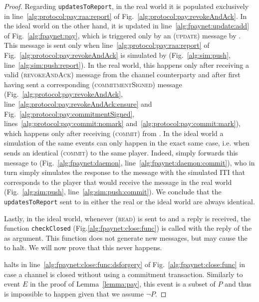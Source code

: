 \begin{proof}
  Regarding \texttt{updatesToReport}, in the real world it is populated
  exclusively in line~\ref{alg:protocol:pay:raa:report} of
  Fig.~\ref{alg:protocol:pay:revokeAndAck}. In the ideal world on the other
  hand, it is updated in line~\ref{alg:fpaynet:update:add} of
  Fig.~\ref{alg:fpaynet:pay}, which is triggered only by an (\textsc{update})
  message by \simulator. This message is sent only when
  line~\ref{alg:protocol:pay:raa:report} of
  Fig.~\ref{alg:protocol:pay:revokeAndAck} is simulated by \simulator{}
  (Fig.~\ref{alg:sim:push}, line~\ref{alg:sim:push:report}). In the real world,
  this happens only after receiving a valid (\textsc{revokeAndAck}) message from
  the channel counterparty and after first having sent a corresponding
  (\textsc{commitmentSigned}) message (Fig.~\ref{alg:protocol:pay:revokeAndAck},
  line~\ref{alg:protocol:pay:revokeAndAck:ensure} and
  Fig.~\ref{alg:protocol:pay:commitmentSigned},
  lines~\ref{alg:protocol:pay:commit:nomark}
  and~\ref{alg:protocol:pay:commit:mark}), which happens only after receiving
  (\textsc{commit}) from \environment. In the ideal world a simulation of the
  same events can only happen in the exact same case, i.e. when \environment{}
  sends an identical (\textsc{commit}) to the same player. Indeed, \fpaynet{}
  simply forwards this message to \simulator{} (Fig.~\ref{alg:fpaynet:daemon},
  line~\ref{alg:fpaynet:daemon:commit}), who in turn simply simulates the
  response to the message with the simulated ITI that corresponds to the player
  that would receive the message in the real world (Fig.~\ref{alg:sim:push},
  line~\ref{alg:sim:push:commit}). We conclude that the \texttt{updatesToReport}
  sent to \environment{} in either the real or the ideal world are always
  identical.

  Lastly, in the ideal world, whenever (\textsc{read}) is sent to \ledger{} and
  a reply is received, the function \texttt{checkClosed}
  (Fig.\ref{alg:fpaynet:close:func}) is called with the reply of the \ledger{}
  as argument. This function does not generate new messages, but may cause the
  \fpaynet{} to halt. We will now prove that this never happens.

  \fpaynet{} halts in line~\ref{alg:fpaynet:close:func:dsforgery} of
  Fig.~\ref{alg:fpaynet:close:func} in case a channel is closed without using a
  commitment transaction. Similarly to event $E$ in the proof of
  Lemma~\ref{lemma:pay}, this event is a subset of $P$ and thus is impossible to
  happen given that we assume $\neg P$.


\end{proof}
